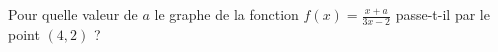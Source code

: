 
\begin{exercice}\label{exosmath-0335}

    Pour quelle valeur de \( a\) le graphe de la fonction \( f(x)=\frac{ x+a }{ 3x-2 }\) passe-t-il par le point \( (4,2)\) ?

\end{exercice}
